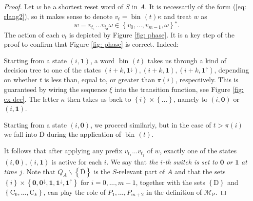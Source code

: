 \documentclass{ws-ijmpc}
\DeclareMathOperator{\bin}{bin\!}
\begin{document}
\begin{proof}
Let $w$ be a shortest reset word of $S$ in $A$. It is necessarily
of the form (\ref{eq: rlang2}), so it makes sense to denote $v_{t}=\bin\left(t\right)\kappa$
and treat $w$ as
\begin{equation}
w=v_{t_{1}}\dots v_{t_{d}}\omega\in\left\{ v_{0},\dots,v_{m-1},\omega\right\} ^{\star}.\label{eq: rlang3}
\end{equation}
The action of each $v_{t}$ is depicted by Figure \ref{fig: phase}.
It is a key step of the proof to confirm that Figure \ref{fig: phase}
is correct. Indeed:
\begin{itemlist}
\item Starting from a state $\left(i,\mathbf{1}\right)$, a word $\bin\left(t\right)$
takes us through a kind of decision tree to one of the states $\left(i+k,\mathbf{1^{\downarrow}}\right),\left(i+k,\mathbf{1}\right),\left(i+k,\mathbf{1^{\uparrow}}\right)$,
depending on whether $t$ is less than, equal to, or greater than
$\pi\!\left(i\right)$, respectively. This is guaranteed by wiring
the sequence $\xi$ into the transition function, see Figure \ref{fig: ex dec}.
The letter $\kappa$ then takes us back to $\left\{ i\right\} \times\left\{ \dots\right\} $,
namely to $\left(i,\mathbf{0}\right)$ or $\left(i,\mathbf{1}\right)$.
\item Starting from a state $\left(i,\mathbf{0}\right)$, we proceed similarly,
but in the case of $t>\pi\!\left(i\right)$ we fall into $\overline{\mathrm{D}}$
during the application of $\bin\left(t\right)$. 
\end{itemlist}
It follows that after applying any prefix $v_{t_{1}}\dots v_{t_{j}}$
of $w$, exactly one of the states $\left(i,\mathbf{0}\right),\left(i,\mathbf{1}\right)$
is active for each $i$. We say that \emph{the $i$-th switch is set
to }\textbf{\emph{$\mathbf{0}$}} \emph{or $\mathbf{1}$} \emph{at
time $j$}. Note that $Q_{A}\backslash\left\{ \overline{\mathrm{D}}\right\} $
is the $S$-relevant part of $A$ and that the sets $\left\{ i\right\} \times\left\{ \mathbf{0},\mathbf{0^{\downarrow}},\mathbf{1},\mathbf{1^{\downarrow}},\mathbf{1^{\uparrow}}\right\} $
for $i=0,\dots,m-1$, together with the sets $\left\{ \mathrm{D}\right\} $
and $\left\{ \mathrm{C}_{0},\dots,\mathrm{C}_{k}\right\} $, can play
the role of $P_{1},\dots,P_{m+2}$ in the definition of $\mathcal{M}_{\mathrm{P}}$.


\end{proof}
\end{document}
